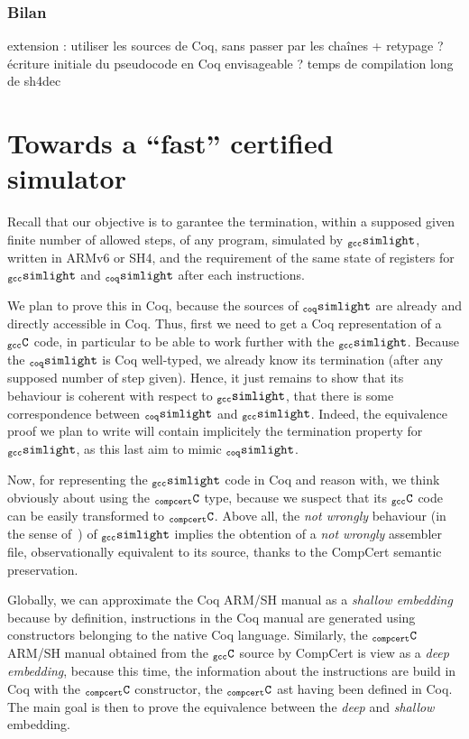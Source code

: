 \documentclass[a4paper, 11pt]{article}
\newcommand{\gccSL}{$_{\tt gcc}{\tt simlight}$\xspace}
\newcommand{\SL}{$_{\tt coq}{\tt simlight}$\xspace}
\newcommand{\C}{$_{\tt compcert}{\tt C}$\xspace}
\newcommand{\gccC}{$_{\tt gcc}{\tt C}$\xspace}
\begin{document}
    \subsubsection{Bilan}
    extension : utiliser les sources de Coq, sans passer par les chaînes + retypage ?
    écriture initiale du pseudocode en Coq envisageable ?
    temps de compilation long de sh4dec

\section{Towards a ``fast'' certified simulator}
\label{s:fast_certi}

Recall that our objective is to garantee the termination, within a supposed given finite number of allowed steps, of any program, simulated by \gccSL, written in ARMv6 or SH4, and the requirement of the same state of registers for \gccSL and \SL after each instructions. 

We plan to prove this in Coq, because the sources of \SL are already and directly accessible in Coq. Thus, first we need to get a Coq representation of a \gccC code, in particular to be able to work further with the \gccSL. 
Because the \SL is Coq well-typed, we already know its termination (after any supposed number of step given). Hence, it just remains to show that its behaviour is coherent with respect to \gccSL, that there is some correspondence between \SL and \gccSL. Indeed, the equivalence proof we plan to write will contain implicitely the termination property for \gccSL, as this last aim to mimic \SL. 

Now, for representing the \gccSL code in Coq and reason with, we think obviously about using the \C type, because we suspect that its \gccC code can be easily transformed to \C. Above all, the \emph{not wrongly} behaviour (in the sense of~\cite{Leroy-Compcert-CACM}) of \gccSL implies the obtention of a \emph{not wrongly} assembler file, observationally equivalent to its source, thanks to the CompCert semantic preservation.

\hspace{1ex}

Globally, we can approximate the Coq ARM/SH manual as a \emph{shallow embedding} because by definition, instructions in the Coq manual are generated using constructors belonging to the native Coq language. Similarly, the \C ARM/SH manual obtained from the \gccC source by CompCert is view as a \emph{deep embedding}, because this time, the information about the instructions are build in Coq with the \C constructor, the \C ast having been defined in Coq. The main goal is then to prove the equivalence between the \emph{deep} and \emph{shallow} embedding.
\end{document}
